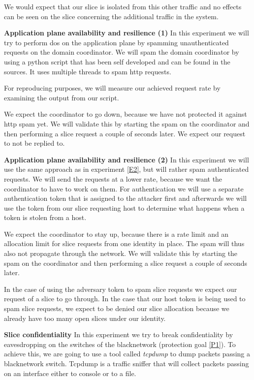 \begin{description}[style=multiline, labelwidth=0.7cm]
    We would expect that our slice is isolated from this other traffic and no effects can be seen on the slice concerning the additional traffic in the system.

    \item[\namedlabel{E2}{E2}] \textbf{Application plane availability and resilience (1)} In this experiment we will try to perform \acrshort{dos} on the application plane by spamming unauthenticated requests on the domain coordinator. We will spam the domain coordinator by using a python script that has been self developed and can be found in the sources. It uses multiple threads to spam http requests.

    For reproducing purposes, we will measure our achieved request rate by examining the output from our script.

    We expect the coordinator to go down, because we have not protected it against http spam yet. We will validate this by starting the spam on the coordinator and then performing a slice request a couple of seconds later. We expect our request to not be replied to.

    \item[\namedlabel{E3}{E3}] \textbf{Application plane availability and resilience (2)} In this experiment we will use the same approach as in experiment \ref{E2}, but will rather spam authenticated requests. We will send the requests at a lower rate, because we want the coordinator to have to work on them. For authentication we will use a separate authentication token that is assigned to the attacker first and afterwards we will use the token from our slice requesting host to determine what happens when a token is stolen from a host.

    We expect the coordinator to stay up, because there is a rate limit and an allocation limit for slice requests from one identity in place. The spam will thus also not propagate through the network. We will validate this by starting the spam on the coordinator and then performing a slice request a couple of seconds later.

    In the case of using the adversary token to spam slice requests we expect our request of a slice to go through. In the case that our host token is being used to spam slice requests, we expect to be denied our slice allocation because we already have too many open slices under our identity.

    \item[\namedlabel{E4}{E4}] \textbf{Slice confidentiality} In this experiment we try to break confidentiality by eavesdropping on the switches of the \gls{blacknetwork} (protection goal \ref{P1}). To achieve this, we are going to use a tool called \textit{tcpdump} \cite{tcpdump} to dump packets passing a \gls{blacknetwork} switch. Tcpdump is a traffic sniffer that will collect packets passing on an interface either to console or to a file.


\end{description}
